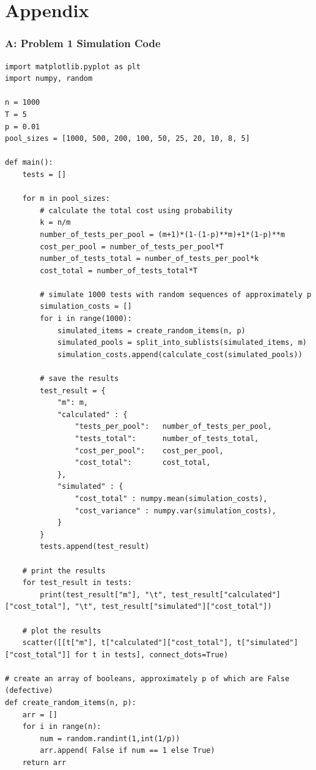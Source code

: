 \documentclass[11pt]{extarticle}
\begin{document}
\newpage

\section*{Appendix}

\subsubsection*{A: Problem 1 Simulation Code}


\tiny
\begin{verbatim}import matplotlib.pyplot as plt
import numpy, random 

n = 1000
T = 5
p = 0.01 
pool_sizes = [1000, 500, 200, 100, 50, 25, 20, 10, 8, 5]

def main():
    tests = []

    for m in pool_sizes:
        # calculate the total cost using probability
        k = n/m 
        number_of_tests_per_pool = (m+1)*(1-(1-p)**m)+1*(1-p)**m
        cost_per_pool = number_of_tests_per_pool*T
        number_of_tests_total = number_of_tests_per_pool*k
        cost_total = number_of_tests_total*T

        # simulate 1000 tests with random sequences of approximately p 
        simulation_costs = []
        for i in range(1000):
            simulated_items = create_random_items(n, p)
            simulated_pools = split_into_sublists(simulated_items, m)
            simulation_costs.append(calculate_cost(simulated_pools))

        # save the results
        test_result = {
            "m": m,
            "calculated" : {
                "tests_per_pool":   number_of_tests_per_pool,
                "tests_total":      number_of_tests_total,
                "cost_per_pool":    cost_per_pool,
                "cost_total":       cost_total,
            },
            "simulated" : {
                "cost_total" : numpy.mean(simulation_costs),
                "cost_variance" : numpy.var(simulation_costs),
            }
        }
        tests.append(test_result)

    # print the results
    for test_result in tests:
        print(test_result["m"], "\t", test_result["calculated"]["cost_total"], "\t", test_result["simulated"]["cost_total"])

    # plot the results
    scatter([[t["m"], t["calculated"]["cost_total"], t["simulated"]["cost_total"]] for t in tests], connect_dots=True)

# create an array of booleans, approximately p of which are False (defective) 
def create_random_items(n, p):
    arr = []
    for i in range(n):
        num = random.randint(1,int(1/p))
        arr.append( False if num == 1 else True)
    return arr 


\end{verbatim}
\end{document}
